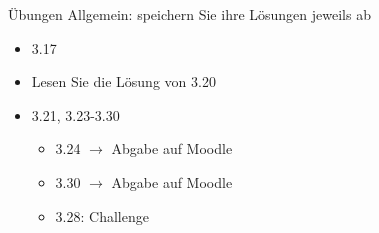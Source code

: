 \begin{frame}{Übungen}
Allgemein: speichern Sie ihre Lösungen jeweils ab
\begin{itemize}
    \item 3.17
    \item Lesen Sie die Lösung von 3.20
    \item 3.21, 3.23-3.30
    \begin{itemize}
        \item 3.24 $\rightarrow$ Abgabe auf Moodle
        \item 3.30 $\rightarrow$ Abgabe auf Moodle
        \item 3.28: Challenge
    \end{itemize}
    
\end{itemize}
\end{frame}